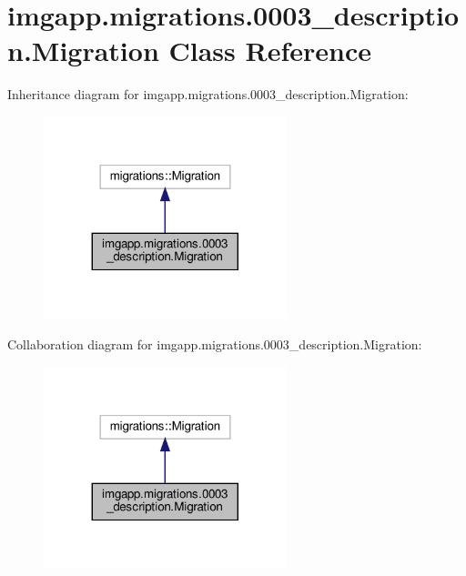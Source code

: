 \hypertarget{classimgapp_1_1migrations_1_10003__description_1_1Migration}{}\section{imgapp.\+migrations.0003\+\_\+description.Migration Class Reference}
\label{classimgapp_1_1migrations_1_10003__description_1_1Migration}


Inheritance diagram for imgapp.\+migrations.0003\+\_\+description.Migration\+:\nopagebreak
\begin{figure}[H]
\begin{center}
\leavevmode
\includegraphics[width=200pt]{classimgapp_1_1migrations_1_10003__description_1_1Migration__inherit__graph}
\end{center}
\end{figure}


Collaboration diagram for imgapp.\+migrations.0003\+\_\+description.Migration\+:\nopagebreak
\begin{figure}[H]
\begin{center}
\leavevmode
\includegraphics[width=200pt]{classimgapp_1_1migrations_1_10003__description_1_1Migration__coll__graph}
\end{center}
\end{figure}
